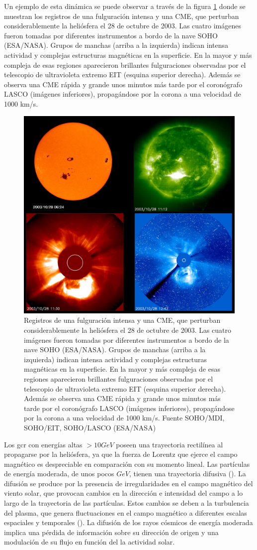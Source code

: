 Un ejemplo de esta dinámica se puede observar a través de la figura \ref{CME_2003} donde se muestran los registros de una fulguración intensa y una CME, que perturban considerablemente la heliósfera el 28 de octubre de 2003. Las cuatro imágenes fueron tomadas por diferentes instrumentos a bordo de la nave SOHO (ESA/NASA). Grupos de manchas (arriba a la izquierda) indican intensa actividad y complejas estructuras magnéticas en la superficie. En la mayor y más compleja de esas regiones aparecieron brillantes fulguraciones observadas por el telescopio de ultravioleta extremo EIT (esquina superior derecha). Además se observa una CME rápida y grande unos minutos más tarde por el coronógrafo LASCO (imágenes inferiores), propagándose por la corona a una velocidad de 1000 km/s.
\begin{figure}[H]
    \centering
    \includegraphics[width=0.6\linewidth]{Figs/flare_2003-10-28.jpg}
    \caption{Registros de una fulguración intensa y una CME, que perturban considerablemente la heliósfera el 28 de octubre de 2003. Las cuatro imágenes fueron tomadas por diferentes instrumentos a bordo de la nave SOHO (ESA/NASA). Grupos de manchas (arriba a la izquierda) indican intensa actividad y complejas estructuras magnéticas en la superficie. En la mayor y más compleja de esas regiones aparecieron brillantes fulguraciones observadas por el telescopio de ultravioleta extremo EIT (esquina superior derecha). Además se observa una CME rápida y grande unos minutos más tarde por el coronógrafo LASCO (imágenes inferiores), propagándose por la corona a una velocidad de 1000 km/s. Fuente SOHO/MDI, SOHO/EIT, SOHO/LASCO (ESA/NASA)}
    \label{CME_2003}
\end{figure}
Los \gls{gcr} con energías altas $>10GeV$ poseen una trayectoria rectilínea  al propagarse por la heliósfera, ya que la fuerza de Lorentz que ejerce el campo magnético es despreciable en comparación con su momento lineal. Las partículas de energía moderada, de unos pocos $GeV$, tienen una trayectoria difusiva (\cite{gaisser_2016}). La difusión se produce por la presencia de irregularidades en el campo magnético del viento solar, que provocan cambios en la dirección e intensidad del campo a lo largo de la trayectoria de las partículas. Estos cambios se deben a la turbulencia del plasma, que genera fluctuaciones en el campo magnético a diferentes escalas espaciales y temporales (\cite{spurio_2015}). La difusión de los rayos cósmicos de energía moderada implica una pérdida de información sobre su dirección de origen y una modulación de su flujo en función del la actividad solar.

